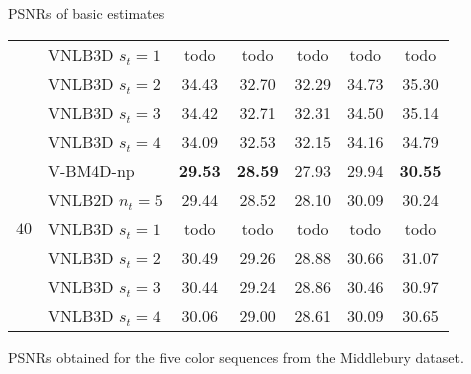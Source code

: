 \documentclass[mathserif, 8pt]{beamer}
\newcommand{\best}[1]{\textbf{\textcolor{MyOrange}{#1}}}
\begin{document}
\begin{frame}{PSNRs of basic estimates}
\begin{center}
{\begin{tabular}{ c | l |c c c c c}
		                      & VNLB3D $s_t = 1$ &       todo   &       todo   &       todo   &       todo   &       todo   \\
		                      & VNLB3D $s_t = 2$ &       34.43  &       32.70  &       32.29  &       34.73  &       35.30  \\
		                      & VNLB3D $s_t = 3$ &       34.42  &       32.71  &       32.31  &       34.50  &       35.14  \\
		                      & VNLB3D $s_t = 4$ &       34.09  &       32.53  &       32.15  &       34.16  &       34.79  \\\hline
%
		\multirow{5}{*}{$40$} & V-BM4D-np        & \best{29.53} & \best{28.59} &       27.93  &       29.94  & \best{30.55} \\%
		                      & VNLB2D $n_t = 5$ &       29.44  &       28.52  &       28.10  &       30.09  &       30.24  \\
		                      & VNLB3D $s_t = 1$ &       todo   &       todo   &       todo   &       todo   &       todo   \\
		                      & VNLB3D $s_t = 2$ &       30.49  &       29.26  &       28.88  &       30.66  &       31.07  \\
		                      & VNLB3D $s_t = 3$ &       30.44  &       29.24  &       28.86  &       30.46  &       30.97  \\
		                      & VNLB3D $s_t = 4$ &       30.06  &       29.00  &       28.61  &       30.09  &       30.65  \\\hline
		\end{tabular}}

	\bigskip

	PSNRs obtained for the five color sequences from the Middlebury dataset.

	\end{center}


\end{frame}
\end{document}
